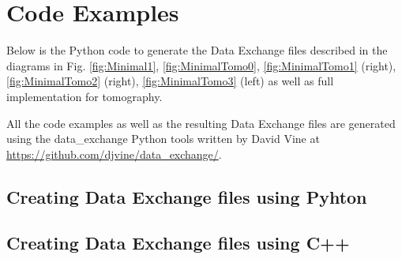 \section{Code Examples}


Below is the Python code to generate the Data Exchange files described in the diagrams in Fig.  \ref{fig:Minimal1}, \ref{fig:MinimalTomo0}, \ref{fig:MinimalTomo1} (right), \ref{fig:MinimalTomo2} (right), \ref{fig:MinimalTomo3} (left) as well as full implementation for tomography.


All the code examples as well as the resulting Data Exchange files are generated using the data\_exchange Python tools written by David Vine at  \url{https://github.com/djvine/data_exchange/}.

\hypersetup{linkcolor = white}
 
\newpage
\subsection{Creating Data Exchange files using Pyhton}

%



\newpage
{}


\newpage
{}


\newpage
{}


\newpage
{}


\newpage
{}


\newpage
{}


\hypersetup{linkcolor = softBlue}

\subsection{Creating Data Exchange files using C++}
